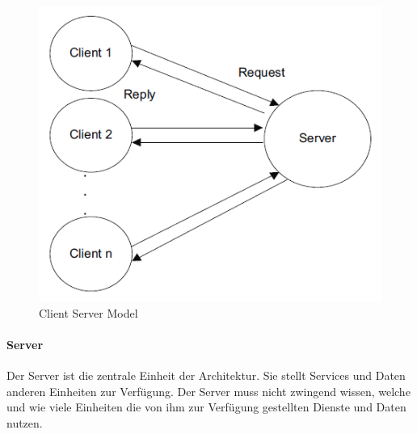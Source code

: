 	\begin{figure}[h]
		\centering
		\includegraphics[width=0.5\linewidth]{images/Clients-und-Server}
		\caption{Client Server Model}
		\label{fig:client-server}
	\end{figure}
	
	\paragraph{Server}
	Der Server ist die zentrale Einheit der Architektur. Sie stellt Services und Daten anderen Einheiten zur Verfügung. Der Server muss nicht zwingend wissen, welche und wie viele Einheiten die von ihm zur Verfügung gestellten Dienste und Daten nutzen.
	
